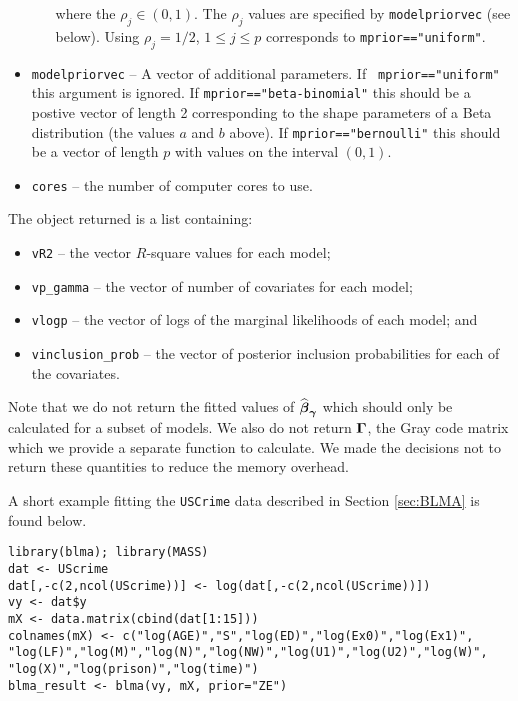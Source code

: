 \begin{itemize}
\begin{itemize}
        \noindent where the $\rho_j\in(0,1)$. The $\rho_j$ values are specified
        by {\tt modelpriorvec} (see below). Using $\rho_j = 1/2$, $1\le j\le p$
        corresponds to {\tt mprior=="uniform"}.
	\end{itemize}
	
    \item {\tt modelpriorvec} -- A vector of additional parameters. If {\tt
        mprior=="uniform"} this argument is ignored.
    If {\tt mprior=="beta-binomial"} this should be a postive vector of length
    2 corresponding to the shape parameters of a Beta distribution (the values
    $a$ and $b$ above). If {\tt mprior=="bernoulli"} this should be a vector of
    length $p$ with values on the interval $(0,1)$.
	
	\item {\tt cores} -- the number of computer cores to use.
\end{itemize}

\noindent 
The object returned is a 
list containing:
\begin{itemize}
	\item 
	{\tt vR2} -- the vector $R$-square values for each model; 
	
	\item 
	{\tt vp\_gamma} -- the vector of number of covariates for each model;
	
	\item 
	{\tt vlogp} -- the vector of logs of the marginal likelihoods of each model; and
	
	\item 
	{\tt vinclusion\_prob} -- the vector of posterior inclusion probabilities for each of the covariates. 
\end{itemize}

\noindent Note that we do not return the fitted values of
$\widehat{{\boldsymbol \beta}}_{{\boldsymbol \gamma}}$ which should only be calculated for a subset of
models. We also do not return ${\boldsymbol \Gamma}$, the Gray code matrix which we provide
a separate function to calculate. We made the decisions not to return these
quantities to reduce the memory overhead.

A short example fitting the {\tt USCrime} data described in Section
\ref{sec:BLMA} is found below.

\begin{verbatim}
library(blma); library(MASS)
dat <- UScrime
dat[,-c(2,ncol(UScrime))] <- log(dat[,-c(2,ncol(UScrime))])
vy <- dat$y
mX <- data.matrix(cbind(dat[1:15]))
colnames(mX) <- c("log(AGE)","S","log(ED)","log(Ex0)","log(Ex1)",
"log(LF)","log(M)","log(N)","log(NW)","log(U1)","log(U2)","log(W)",
"log(X)","log(prison)","log(time)") 
blma_result <- blma(vy, mX, prior="ZE")
\end{verbatim}

